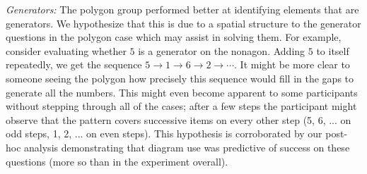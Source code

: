 \documentclass[man,mask,10pt]{apa6}
\begin{document}
\textit{Generators:} The polygon group performed better at identifying elements that are generators. We hypothesize that this is due to a spatial structure to the generator questions in the polygon case which may assist in solving them. For example, consider evaluating whether $5$ is a generator on the nonagon. Adding $5$ to itself repeatedly, we get the sequence $5 \rightarrow 1 \rightarrow 6 \rightarrow 2 \rightarrow \cdots$. It might be more clear to someone seeing the polygon how precisely this sequence would fill in the gaps to generate all the numbers. This might even become apparent to some participants without stepping through all of the cases; after a few steps the participant might observe that the pattern covers successive items on every other step (5, 6, ... on odd steps, 1, 2, ... on even steps). This hypothesis is corroborated by our post-hoc analysis demonstrating that diagram use was predictive of success on these questions (more so than in the experiment overall). 
\end{document}
